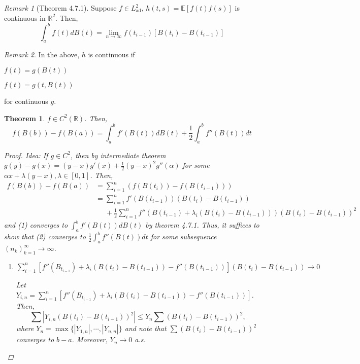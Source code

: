 \documentclass[12pt]{report}
\newcommand{\R}{\mathbb{R}}
\newcommand{\E}{\mathbb{E}}
\renewcommand{\1}{\mathbb{1}}
\theoremstyle{break}
\newtheorem{thm}{Theorem}[section] %
\theoremstyle{newdef}
\theoremstyle{remark}
\newtheorem*{rem}{Remark} %
\begin{document}
\begin{rem}[Theorem 4.7.1]
Suppose $f \in L^2_{\text{ad}}$, $h(t,s) = \E[f(t)f(s)]$ is continuous in $\R^2$.
Then,
$$
\int_a^b f(t)dB(t) = \lim_{n\rightarrow\infty} f(t_{i-1})[B(t_i) - B(t_{i-1})]
$$
\end{rem}

\begin{rem}
In the above, $h$ is continuous if
\begin{enumerate*}[label=(\arabic*)]
\item $f(t) = g(B(t))$
\item $f(t) = g(t,B(t))$
\end{enumerate*}
for continuous $g$.
\end{rem}



\begin{thm}
$f \in C^2(\R)$.
Then,
$$
f(B(b)) - f(B(a)) = \int_a^b f'(B(t))dB(t) + \frac{1}{2} \int_a^b f''(B(t))dt
$$

\begin{proof}
Idea: If $g \in C^2$, then by intermediate theorem $g(y) - g(x) = (y-x)g'(x) + \frac{1}{2}(y-x)^2 g''(\alpha)$ for some $\alpha x + \lambda(y-x), \lambda \in [0,1]$.
Then,
\begin{align}
f(B(b)) - f(B(a))
&= \sum_{i=1}^n \left( f(B(t_i)) - f(B(t_{i-1})) \right)\tag*{}\\
&= \sum_{i=1}^n f'(B(t_{i-1}))(B(t_i) - B(t_{i-1}))\tag{1}\\
&\phantom{= }+ \frac{1}{2} \sum_{i=1}^n f''\left(B(t_{i-1}) + \lambda_i(B(t_i) - B(t_{i-1}))\right) (B(t_i) - B(t_{i-1}))^2\tag{2}
\end{align}
and (1) converges to $\int_a^b f'(B(t))dB(t)$ by theorem 4.7.1.
Thus, it suffices to show that (2) converges to $\frac{1}{2} \int_a^b f''(B(t))dt$ for some subsequence $(n_k)_{k=1}^\infty \rightarrow \infty$.

\begin{enumerate}[label={\bfseries STEP \arabic*}, wide]
\item
$\sum_{i=1}^n \left[ f''(B_{t_{i-1}}) + \lambda_i (B(t_i) - B(t_{i-1})) - f''(B(t_{i-1})) \right] (B(t_i) - B(t_{i-1})) \rightarrow 0$

Let $Y_{i,n} = \sum_{i=1}^n \left[ f''(B_{t_{i-1}}) + \lambda_i (B(t_i) - B(t_{i-1})) - f''(B(t_{i-1})) \right]$.
Then,
$$\sum |Y_{i,n} (B(t_i) - B(t_{i-1}))^2| \leq Y_n \sum(B(t_i) - B(t_{i-1}))^2,$$
where $Y_n = \max\{|Y_{1,n}|, \cdots ,|Y_{n,n}|\}$ and note that
$\sum (B(t_i) - B(t_{i-1}))^2$ converges to $b-a$.
Moreover, $Y_n \rightarrow 0$ a.s.


\end{enumerate}
\end{proof}
\end{thm}
\end{document}

